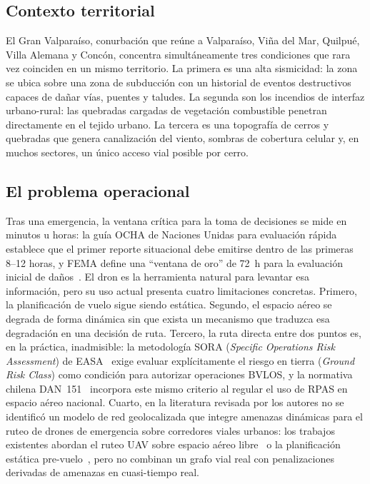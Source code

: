 \documentclass[conference]{IEEEtran}
\begin{document}
\subsection{Contexto territorial}

El Gran Valparaíso, conurbación que reúne a Valparaíso, Viña del Mar, Quilpué, Villa Alemana y Concón, concentra simultáneamente tres condiciones que rara vez coinciden en un mismo territorio. La primera es una alta sismicidad: la zona se ubica sobre una zona de subducción con un historial de eventos destructivos capaces de dañar vías, puentes y taludes. La segunda son los incendios de interfaz urbano-rural: las quebradas cargadas de vegetación combustible penetran directamente en el tejido urbano. La tercera es una topografía de cerros y quebradas que genera canalización del viento, sombras de cobertura celular y, en muchos sectores, un único acceso vial posible por cerro.

\subsection{El problema operacional}

Tras una emergencia, la ventana crítica para la toma de decisiones se mide en minutos u horas: la guía OCHA de Naciones Unidas para evaluación rápida establece que el primer reporte situacional debe emitirse dentro de las primeras 8--12 horas, y FEMA define una ``ventana de oro'' de 72~h para la evaluación inicial de daños~\cite{ocha2012,fema2016}. El dron es la herramienta natural para levantar esa información, pero su uso actual presenta cuatro limitaciones concretas. Primero, la planificación de vuelo sigue siendo estática. Segundo, el espacio aéreo se degrada de forma dinámica sin que exista un mecanismo que traduzca esa degradación en una decisión de ruta. Tercero, la ruta directa entre dos puntos es, en la práctica, inadmisible: la metodología SORA (\textit{Specific Operations Risk Assessment}) de EASA~\cite{easa2019} exige evaluar explícitamente el riesgo en tierra (\textit{Ground Risk Class}) como condición para autorizar operaciones BVLOS, y la normativa chilena DAN~151~\cite{dgac2020} incorpora este mismo criterio al regular el uso de RPAS en espacio aéreo nacional. Cuarto, en la literatura revisada por los autores no se identificó un modelo de red geolocalizada que integre amenazas dinámicas para el ruteo de drones de emergencia sobre corredores viales urbanos: los trabajos existentes abordan el ruteo UAV sobre espacio aéreo libre~\cite{hu2020} o la planificación estática pre-vuelo~\cite{almozel2025}, pero no combinan un grafo vial real con penalizaciones derivadas de amenazas en cuasi-tiempo real.
\end{document}
